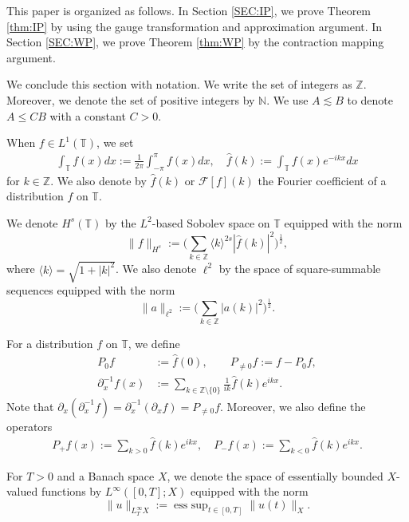 \documentclass[%
11pt,  reqno]{amsart}
\DeclareMathOperator*{\esssup}{ess \ sup}
\newcommand{\Z}{\mathbb{Z}}
\newcommand{\R}{\mathbb{R}}
\newcommand{\T}{\mathbb{T}}
\newcommand{\N}{\mathbb{N}}
\newcommand{\ft}{\widehat}
\newcommand{\Ft}{{\mathcal{F}}}
\newcommand{\dx}{\partial_x}
\renewcommand{\l}{\ell}
\newcommand{\les}{\lesssim}
\newcommand{\jb}[1]
{\langle #1 \rangle}
\numberwithin{equation}{section}
\numberwithin{theorem}{section}
\begin{document}
This paper is organized as follows.
In Section \ref{SEC:IP}, 
we prove Theorem \ref{thm:IP} by using the gauge transformation and 
approximation argument. 
In Section \ref{SEC:WP}, we prove Theorem \ref{thm:WP} by the contraction mapping argument.


We conclude this section with notation.
We write the set of integers as $\Z$. 
Moreover, we denote the set of positive integers by $\N$.
We use $A \les B$ to denote $A \le C B$ with a constant $C>0$.

When $f \in L^1(\T)$, we set
\begin{align*}
\int_\T f(x) dx
:=
\frac 1{2\pi} \int_{-\pi}^\pi f(x) dx,
\quad
\ft f(k)
:= \int_\T f(x) e^{-ikx} dx
\end{align*}
for $k \in \Z$.
We also denote by $\ft f(k)$ or $\Ft [f](k)$ the Fourier coefficient of a distribution $f$ on $\T$.

We denote $H^s(\T)$ by the $L^2$-based Sobolev space on $\T$
equipped with the norm
\[
\| f \|_{H^s} :=
\Big( \sum_{k \in \Z} \jb{k}^{2s} |\ft f(k)|^2 \Big)^{\frac 12},
\]
where $\jb {k} = \sqrt{1 + |k|^2}$.
We also denote $\l^2$ by the space of square-summable sequences
equipped with the norm
\[
\| a \|_{\l^2} :=
\Big( \sum_{k \in \Z}|a(k)|^2 \Big)^{\frac 12}.
\]


For a distribution $f$ on $\T$,
we define
\begin{align*}
P_0 f
&:=
\ft f(0),
\qquad
P_{\neq 0} f
:=
f - P_0 f,
\\
\dx^{-1} f (x)
&:=
\sum_{k \in \Z \setminus \{0\}} \frac1{ik} \ft f(k) 
e^{ikx}.
\end{align*}
Note that $\dx (\dx^{-1} f) = \dx^{-1} (\dx f) = P_{\neq 0} f$.
Moreover, we also define the operators
\begin{align*}
P_+ f (x) := \sum_{k>0} \ft f(k) e^{ikx},
\quad
P_- f (x) := \sum_{k<0} \ft f(k) e^{ikx}.
\end{align*}

For $T>0$ and a Banach space $X$,
we denote the space of essentially bounded $X$-valued functions by $L^\infty([0,T]; X)$ equipped with the norm
\[
\| u \|_{L_T^\infty X}
:=
\esssup_{t \in [0,T]} 
\| u (t) \|_{X}.
\]
\end{document}
